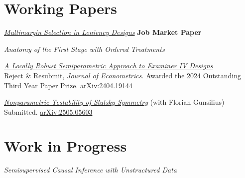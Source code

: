 \documentclass[11pt]{article}
\begin{document}
\section*{Working Papers}
\begin{hang}
\item \href{https://lonjezosithole.github.io/research/}{\textit{Multimargin Selection in Leniency Designs}} \hfill \textbf{Job Market Paper}

\item \textit{Anatomy of the First Stage with Ordered Treatments}

\item \href{https://arxiv.org/abs/2404.19144}{\textit{A Locally Robust Semiparametric Approach to Examiner IV Designs}} \\
Reject \& Resubmit, \textit{Journal of Econometrics}. Awarded the 2024 Outstanding Third Year Paper Prize. \href{https://arxiv.org/abs/2404.19144}{arXiv:2404.19144}

\item \href{https://arxiv.org/abs/2505.05603}{\textit{Nonparametric Testability of Slutsky Symmetry}} (with Florian Gunsilius) \\
Submitted. \href{https://arxiv.org/abs/2505.05603}{arXiv:2505.05603}
\end{hang}

\section*{Work in Progress}
\begin{hang}
\item \textit{Semisupervised Causal Inference with Unstructured Data}
\end{hang}
\end{document}
